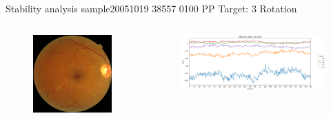 \documentclass{beamer}
\begin{document}
\begin{frame}{Stability analysis sample}{20051019 38557 0100 PP Target: 3 Rotation}
\begin{columns}
\begin{column}{0.3\textwidth}
\begin{figure}[p]
\centering
\includegraphics[width=\textwidth]{chapter_stability/20051019_38557_0100_PP/20051019_38557_0100_PP.jpeg}
\end{figure}	
\end{column}
\begin{column}{0.45\textwidth}  %
\begin{figure}[p]
\centering
\includegraphics[width=\textwidth]{chapter_stability/20051019_38557_0100_PP/r/scores.png}
\end{figure}
\centering
\href{run:videos_stability/Messidor_20051019_38557_0100_PP_Target_3_Checking_Rotation_Sensitivity.mp4}{\color{blue}{Rotation Visualization}} 
\end{column}
\end{columns}
\end{frame}
\end{document}
